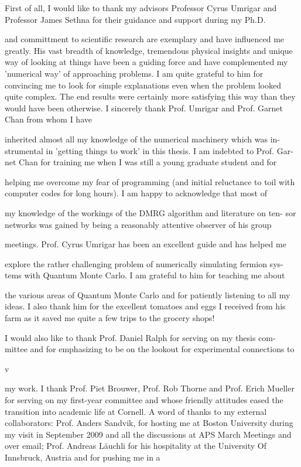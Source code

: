 \documentclass[phd,tocprelim]{cornell}
\begin{document}
\begin{acknowledgements}
First of all, I would like to thank my advisors Professor Cyrus Umrigar and Professor James Sethna for their guidance and support during my Ph.D.

and committment to scientific research are exemplary and have influenced me
greatly. His vast breadth of knowledge, tremendous physical insights and unique
way of looking at things have been a guiding force and have complemented
my ’numerical way’ of approaching problems. I am quite grateful to him for
convincing me to look for simple explanations even when the problem looked
quite complex. The end results were certainly more satisfying this way than
they would have been otherwise.
I sincerely thank Prof. Umrigar and Prof. Garnet Chan from whom I have

inherited almost all my knowledge of the numerical machinery which was in-
strumental in ’getting things to work’ in this thesis. I am indebted to Prof. Gar-
net Chan for training me when I was still a young graduate student and for

helping me overcome my fear of programming (and initial reluctance to toil
with computer codes for long hours). I am happy to acknowledge that most of

my knowledge of the workings of the DMRG algorithm and literature on ten-
sor networks was gained by being a reasonably attentive observer of his group

meetings. Prof. Cyrus Umrigar has been an excellent guide and has helped me

explore the rather challenging problem of numerically simulating fermion sys-
tems with Quantum Monte Carlo. I am grateful to him for teaching me about

the various areas of Quantum Monte Carlo and for patiently listening to all my
ideas. I also thank him for the excellent tomatoes and eggs I received from his
farm as it saved me quite a few trips to the grocery shops!

I would also like to thank Prof. Daniel Ralph for serving on my thesis com-
mittee and for emphasizing to be on the lookout for experimental connections to

v

my work. I thank Prof. Piet Brouwer, Prof. Rob Thorne and Prof. Erich Mueller
for serving on my first-year committee and whose friendly attitudes eased the
transition into academic life at Cornell.
A word of thanks to my external collaborators: Prof. Anders Sandvik, for
hosting me at Boston University during my visit in September 2009 and all the
discussions at APS March Meetings and over email; Prof. Andreas Läuchli for
his hospitality at the University Of Innsbruck, Austria and for pushing me in a


\end{acknowledgements}
\end{document}
